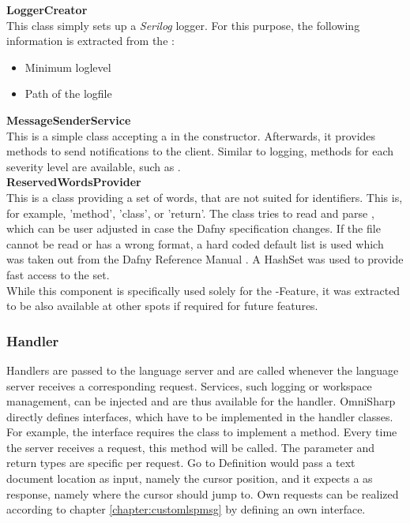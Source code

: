 \textbf{LoggerCreator}\\
This class simply sets up a \textit{Serilog} \cite{serilog} logger.
For this purpose, the following information is extracted from the :
\begin{itemize}
    \item Minimum loglevel
    \item Path of the logfile
\end{itemize}

\textbf{MessageSenderService}\\
This is a simple class accepting a  in the constructor.
Afterwards, it provides methods to send notifications to the client.
Similar to logging, methods for each severity level are available, such as .\\

\textbf{ReservedWordsProvider}\\
This is a class providing a set of words, that are not suited for identifiers.
This is, for example, 'method', 'class', or 'return'.
The class tries to read and parse , which can be user adjusted in case the Dafny specification changes.
If the file cannot be read or has a wrong format, a hard coded default list is used which was taken out from the Dafny Reference Manual \cite{dafnyReferenceManual}.
A HashSet was used to provide fast access to the set.\\

While this component is specifically used solely for the -Feature, it was extracted to be also available at other spots if required for future features.

\subsubsection{Handler}
Handlers are passed to the language server and are called whenever the language server receives a corresponding request.
Services, such logging or workspace management, can be injected and are thus available for the handler.
OmniSharp directly defines interfaces, which have to be implemented in the handler classes.
For example, the interface  requires the class to implement a  method.
Every time the server receives a  request, this  method will be called.
The parameter and return types are specific per request.
Go to Definition would pass a text document location as input, namely the cursor position, and it expects a  as response, namely where the cursor should jump to.
Own requests can be realized according to chapter \ref{chapter:customlspmsg} by defining an own interface.\\

